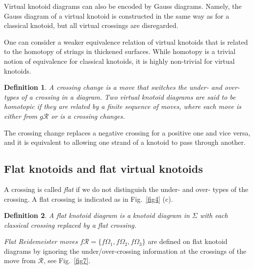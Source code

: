 \documentclass[11pt]{amsart}
\theoremstyle{noparens}
\newtheorem{definition}{Definition}[section]
\numberwithin{equation}{section}
\numberwithin{equation}{section}
\begin{document}
Virtual knotoid diagrams can also be encoded by Gauss diagrams. Namely, the Gauss diagram of a virtual knotoid is constructed in the same way as for a classical knotoid, but all virtual crossings are disregarded.

One can consider a weaker equivalence relation of virtual knotoids that is related to the homotopy of strings in thickened surfaces. While homotopy is a trivial notion of equivalence for classical knotoids, it is highly non-trivial for virtual knotoids. 

\begin{definition} {\rm 
A \textit{crossing change} is a move that switches the under- and over-types of a crossing in a diagram.  
Two virtual knotoid diagrams are said to be \textit{homotopic} if they are related by a finite sequence of moves, where each move is either from $\textit{g}\mathcal{R}$ or is a crossing changes. 
}
\end{definition}

The crossing change replaces a negative crossing for a positive one and vice versa, and it is equivalent to allowing one strand of a knotoid to pass through another. 

\subsection{Flat knotoids and flat virtual knotoids}

A crossing is called \textit{flat} if we do not distinguish the under- and over- types of the crossing. A flat crossing is indicated as in Fig.~\ref{fig4} (c).  

\begin{definition}{\rm 
A \textit{flat knotoid diagram} is a knotoid diagram in $\Sigma$ with each classical crossing replaced by a flat crossing.
}
\end{definition}

\textit{Flat Reidemeister moves} $\textit{f}\mathcal{R} = \{ f\Omega_1, f\Omega_2, f\Omega_3\}$ are defined on flat knotoid diagrams by ignoring the under/over-crossing information at the crossings of the move from $\mathcal{R}$, see Fig.~\ref{fig7}.
\end{document}

